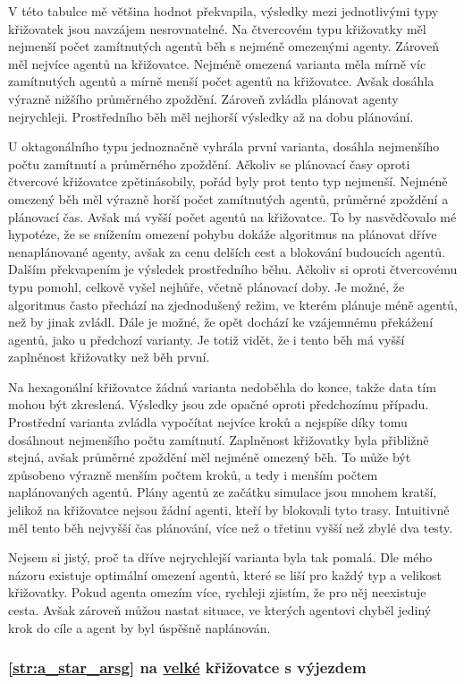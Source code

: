 V této tabulce mě většina hodnot překvapila, výsledky mezi jednotlivými typy křižovatek jsou navzájem nesrovnatelné.
Na čtvercovém typu křižovatky měl nejmenší počet zamítnutých agentů běh s nejméně omezenými agenty.
Zároveň měl nejvíce agentů na křižovatce.
Nejméně omezená varianta měla mírně víc zamítnutých agentů a mírně menší počet agentů na křižovatce.
Avšak dosáhla výrazně nižšího průměrného zpoždění.
Zároveň zvládla plánovat agenty nejrychleji.
Prostředního běh měl nejhorší výsledky až na dobu plánování.

U oktagonálního typu jednoznačně vyhrála první varianta,
dosáhla nejmenšího počtu zamítnutí a průměrného zpoždění.
Ačkoliv se plánovací časy oproti čtvercové křižovatce zpětinásobily, pořád byly prot tento typ nejmenší.
Nejméně omezený běh měl výrazně horší počet zamítnutých agentů, průměrné zpoždění a plánovací čas.
Avšak má vyšší počet agentů na křižovatce.
To by nasvědčovalo mé hypotéze, že se snížením omezení pohybu dokáže algoritmus na plánovat dříve nenaplánované agenty,
avšak za cenu delších cest a blokování budoucích agentů.
Dalším překvapením je výsledek prostředního běhu.
Ačkoliv si oproti čtvercovému typu pomohl, celkově vyšel nejhůře, včetně plánovací doby.
Je možné, že algoritmus často přechází na zjednodušený režim, ve kterém plánuje méně agentů, než by jinak zvládl.
Dále je možné, že opět dochází ke vzájemnému překážení agentů, jako u předchozí varianty.
Je totiž vidět, že i tento běh má vyšší zaplněnost křižovatky než běh první.

Na hexagonální křižovatce žádná varianta nedoběhla do konce, takže data tím mohou být zkreslená.
Výsledky jsou zde opačné oproti předchozímu případu.
Prostřední varianta zvládla vypočítat nejvíce kroků a nejspíše díky tomu dosáhnout nejmenšího počtu zamítnutí.
Zaplněnost křižovatky byla přibližně stejná, avšak průměrné zpoždění měl nejméně omezený běh.
To může být způsobeno výrazně menším počtem kroků, a tedy i menším počtem naplánovaných agentů.
Plány agentů ze začátku simulace jsou mnohem kratší,
jelikož na křižovatce nejsou žádní agenti, kteří by blokovali tyto trasy.
Intuitivně měl tento běh nejvyšší čas plánování, více než o třetinu vyšší než zbylé dva testy.

Nejsem si jistý, proč ta dříve nejrychlejší varianta byla tak pomalá.
Dle mého názoru existuje optimální omezení agentů, které se liší pro každý typ a velikost křižovatky.
Pokud agenta omezím více, rychleji zjistím, že pro něj neexistuje cesta.
Avšak zároveň můžou nastat situace, ve kterých agentovi chyběl jediný krok do cíle
a agent by byl úspěšně naplánován.



\subsubsection{\ref{str:a_star_arsg} na \hyperref[par:data_velka]{velké} křižovatce s výjezdem}
\label{subsubsec:exp_arsg_velka_krizovatka_s_vyjezdem}


